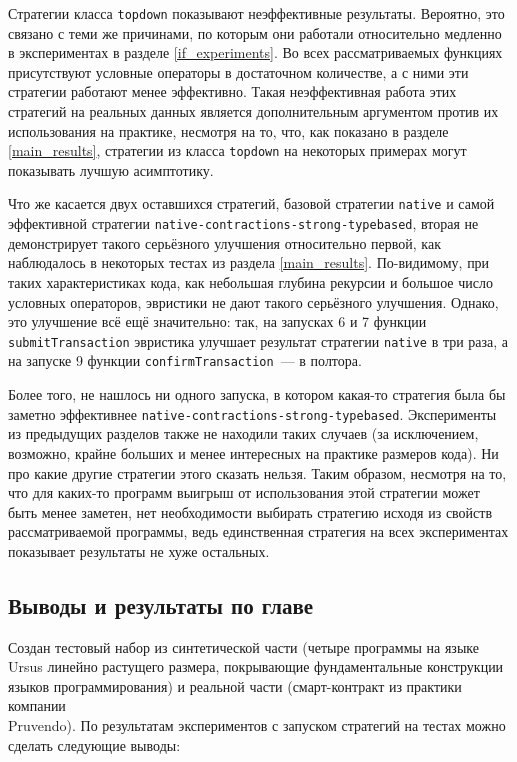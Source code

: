 \documentclass[../thesis.tex]{subfiles}
\begin{document}
Стратегии класса \texttt{topdown} показывают неэффективные результаты. Вероятно, это связано с теми же причинами, по которым они работали относительно медленно в экспериментах в разделе \ref{if_experiments}. Во всех рассматриваемых функциях присутствуют условные операторы в достаточном количестве, а с ними эти стратегии работают менее эффективно. Такая неэффективная работа этих стратегий на реальных данных является дополнительным аргументом против их использования на практике, несмотря на то, что, как показано в разделе \ref{main_results}, стратегии из класса \texttt{topdown} на некоторых примерах могут показывать лучшую асимптотику.

Что же касается двух оставшихся стратегий, базовой стратегии \texttt{native} и самой эффективной стратегии \texttt{native-contractions-strong-typebased}, вторая не демонстрирует такого серьёзного улучшения относительно первой, как наблюдалось в некоторых тестах из раздела \ref{main_results}. По-видимому, при таких характеристиках кода, как небольшая глубина рекурсии и большое число условных операторов, эвристики не дают такого серьёзного улучшения. Однако, это улучшение всё ещё значительно: так, на запусках 6 и 7 функции \texttt{submitTransaction} эвристика улучшает результат стратегии \texttt{native} в три раза, а на запуске 9 функции \texttt{confirmTransaction}~--- в полтора.

Более того, не нашлось ни одного запуска, в котором какая-то стратегия была бы заметно эффективнее \texttt{native-contractions-strong-typebased}. Эксперименты из предыдущих разделов также не находили таких случаев (за исключением, возможно, крайне больших и менее интересных на практике размеров кода). Ни про какие другие стратегии этого сказать нельзя. Таким образом, несмотря на то, что для каких-то программ выигрыш от использования этой стратегии может быть менее заметен, нет необходимости выбирать стратегию исходя из свойств рассматриваемой программы, ведь единственная стратегия на всех экспериментах показывает результаты не хуже остальных.

\subsection{Выводы и результаты по главе}

Создан тестовый набор из синтетической части (четыре программы на языке Ursus линейно растущего размера, покрывающие фундаментальные конструкции языков программирования) и реальной части (смарт-контракт из практики компании\\Pruvendo). По результатам экспериментов с запуском стратегий на тестах можно сделать следующие выводы:
\end{document}
